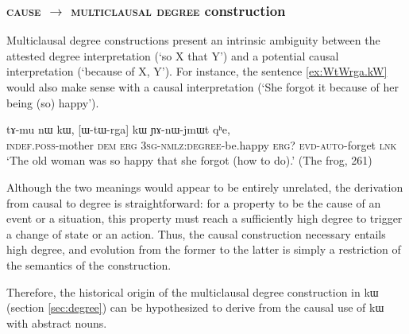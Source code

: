 \documentclass[oldfontcommands,oneside,a4paper,11pt]{article}
\newcommand{\ipa}[1]{{\phon #1}} %
\begin{document}
 

\subsubsection{\textsc{cause} $\rightarrow$ \textsc{multiclausal degree} construction} \label{sec:cause2degree}

Multiclausal degree constructions  present an intrinsic ambiguity between the attested degree interpretation (`so X that Y') and a potential causal interpretation (`because of X, Y').  For instance, the sentence \ref{ex:WtWrga.kW} would also make sense  with a causal interpretation (`She forgot it because of her being (so) happy').



 \begin{exe} 
 \ex \label{ex:WtWrga.kW}
\gll 
\ipa{tɤ-mu}  	\ipa{nɯ}  	\ipa{kɯ,}  	  	[\ipa{ɯ-tɯ-rga}]  	\ipa{kɯ}  	\ipa{ɲɤ-nɯ-jmɯt}  	\ipa{qʰe,}  \\
\textsc{indef.poss}-mother \textsc{dem} \textsc{erg} \textsc{3sg-nmlz:degree}-be.happy \textsc{erg?} \textsc{evd-auto}-forget  \textsc{lnk} \\
\glt `The old woman was so happy that she forgot (how to do).' (The frog, 261)
 \end{exe} 
 
 

% 
 

Although the two meanings would appear to be entirely unrelated, the derivation from causal to degree is straightforward: for a property to be the cause of an event or a situation, this property must reach a sufficiently high degree to trigger a change of state or an action. Thus,  the causal construction necessary entails high degree, and evolution from the former to the latter is simply a restriction of the semantics of the construction.

Therefore, the historical origin of the multiclausal   degree construction in \ipa{kɯ}   (section \ref{sec:degree})   can be hypothesized to derive  from  the causal use of \ipa{kɯ}   with abstract nouns. %
\end{document}
